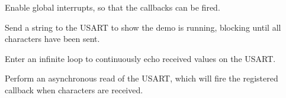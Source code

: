 \begin{DoxyEnumerate}
\item Enable global interrupts, so that the callbacks can be fired. 
\begin{DoxyCodeInclude}{0}
\end{DoxyCodeInclude}

\item Send a string to the U\+S\+A\+RT to show the demo is running, blocking until all characters have been sent. 
\begin{DoxyCodeInclude}{0}
\end{DoxyCodeInclude}

\item Enter an infinite loop to continuously echo received values on the U\+S\+A\+RT. 
\begin{DoxyCodeInclude}{0}
\end{DoxyCodeInclude}

\item Perform an asynchronous read of the U\+S\+A\+RT, which will fire the registered callback when characters are received. 
\begin{DoxyCodeInclude}{0}
\end{DoxyCodeInclude}

\end{DoxyEnumerate}